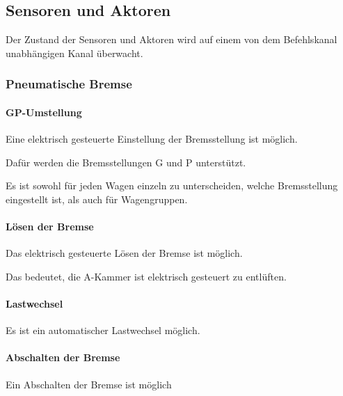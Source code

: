 \subsection{Sensoren und Aktoren}
\begin{feat}
Der Zustand der Sensoren und Aktoren wird auf einem von dem Befehlskanal unabhängigen Kanal überwacht.
\end{feat}
\subsubsection{Pneumatische Bremse}
\paragraph{GP-Umstellung}
\begin{feat}
Eine elektrisch gesteuerte Einstellung der Bremsstellung ist möglich.
\end{feat}
\begin{rem} [zu Anf. 14]
Dafür werden die Bremsstellungen G und P unterstützt.
\end{rem}
\begin{rem} [zu Anf. 14]
Es ist sowohl für jeden Wagen einzeln zu unterscheiden, welche Bremsstellung eingestellt ist, als auch für Wagengruppen.%
\end{rem}

\paragraph{Lösen der Bremse}
\begin{feat}
Das elektrisch gesteuerte Lösen der Bremse ist möglich.
\end{feat}
\begin{rem}[zu Anf. 15]
Das bedeutet, die A-Kammer ist elektrisch gesteuert zu entlüften.
\end{rem}

\paragraph{Lastwechsel}
\begin{feat}
Es ist ein automatischer Lastwechsel möglich.
\end{feat}

\paragraph{Abschalten der Bremse}
\begin{feat}
Ein Abschalten der Bremse ist möglich
\end{feat}

